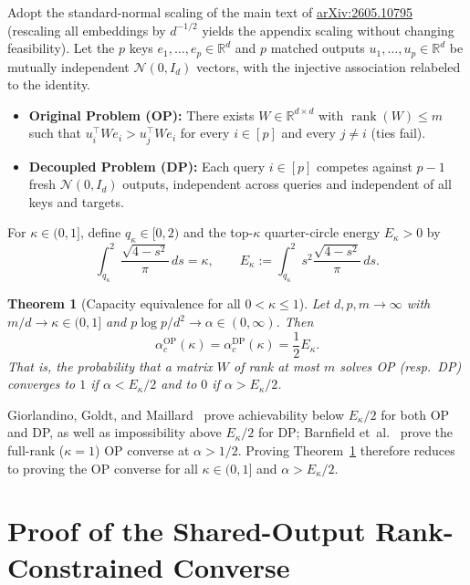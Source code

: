 \documentclass[11pt]{article}
\theoremstyle{plain}
\newtheorem{theorem}{Theorem}
\theoremstyle{definition}
\theoremstyle{remark}
\DeclareMathOperator{\rank}{rank}
\begin{document}
Adopt the standard-normal scaling of the main text of \href{https://arxiv.org/abs/2605.10795}{arXiv:2605.10795} (rescaling all embeddings by $d^{-1/2}$ yields the appendix scaling without changing feasibility). Let the $p$ keys $e_1, \dots, e_p \in \mathbb{R}^d$ and $p$ matched outputs $u_1, \dots, u_p \in \mathbb{R}^d$ be mutually independent $\mathcal{N}(0, I_d)$ vectors, with the injective association relabeled to the identity.
\begin{itemize}[leftmargin=2em,itemsep=2pt]
\item \textbf{Original Problem (\textup{OP}):} There exists $W \in \mathbb{R}^{d \times d}$ with $\rank(W) \le m$ such that $u_i^\top W e_i > u_j^\top W e_i$ for every $i \in [p]$ and every $j \neq i$ (ties fail).
\item \textbf{Decoupled Problem (\textup{DP}):} Each query $i \in [p]$ competes against $p - 1$ fresh $\mathcal{N}(0, I_d)$ outputs, independent across queries and independent of all keys and targets.
\end{itemize}
For $\kappa \in (0, 1]$, define $q_\kappa \in [0, 2)$ and the top-$\kappa$ quarter-circle energy $E_\kappa > 0$ by
\begin{equation}\label{eq:Ekappa}
\int_{q_\kappa}^{2} \frac{\sqrt{4 - s^2}}{\pi}\,ds = \kappa,
\qquad
E_\kappa := \int_{q_\kappa}^{2} s^2 \frac{\sqrt{4 - s^2}}{\pi}\,ds.
\end{equation}

\begin{theorem}[Capacity equivalence for all $0 < \kappa \le 1$]\label{thm:capacity}
Let $d, p, m \to \infty$ with $m/d \to \kappa \in (0, 1]$ and $p \log p / d^2 \to \alpha \in (0, \infty)$. Then
\[
\alpha_c^{\mathrm{OP}}(\kappa) = \alpha_c^{\mathrm{DP}}(\kappa) = \frac{1}{2} E_\kappa.
\]
That is, the probability that a matrix $W$ of rank at most $m$ solves \textup{OP} (resp.\ \textup{DP}) converges to $1$ if $\alpha < E_\kappa / 2$ and to $0$ if $\alpha > E_\kappa / 2$.
\end{theorem}

Giorlandino, Goldt, and Maillard~\cite{giorlandino2026} prove achievability below $E_\kappa / 2$ for both \textup{OP} and \textup{DP}, as well as impossibility above $E_\kappa / 2$ for \textup{DP}; Barnfield et~al.~\cite{barnfield2026} prove the full-rank ($\kappa = 1$) \textup{OP} converse at $\alpha > 1/2$. Proving Theorem~\ref{thm:capacity} therefore reduces to proving the \textup{OP} converse for all $\kappa \in (0, 1]$ and $\alpha > E_\kappa / 2$.

\section{Proof of the Shared-Output Rank-Constrained Converse}
\end{document}
